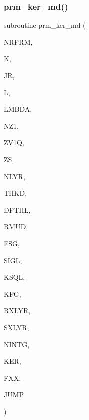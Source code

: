 \subsubsection{\texorpdfstring{prm\+\_\+ker\+\_\+md()}{prm\_ker\_md()}}
{\footnotesize\ttfamily subroutine prm\+\_\+ker\+\_\+md (\begin{DoxyParamCaption}\item[{integer}]{N\+R\+P\+RM,  }\item[{integer}]{K,  }\item[{integer}]{JR,  }\item[{integer}]{L,  }\item[{real(kind=ql)}]{L\+M\+B\+DA,  }\item[{integer}]{N\+Z1,  }\item[{real(kind=ql), dimension(nz1)}]{Z\+V1Q,  }\item[{real(kind=ql)}]{ZS,  }\item[{integer}]{N\+L\+YR,  }\item[{real(kind=ql), dimension (nlyr)}]{T\+H\+KD,  }\item[{real(kind=ql), dimension (nlyr)}]{D\+P\+T\+HL,  }\item[{real(kind=ql), dimension(0\+:nlyr)}]{R\+M\+UD,  }\item[{complex (kind=ql)}]{F\+SG,  }\item[{complex(kind=ql), dimension (nlyr)}]{S\+I\+GL,  }\item[{complex(kind=ql), dimension (nlyr)}]{K\+S\+QL,  }\item[{integer}]{K\+FG,  }\item[{integer}]{R\+X\+L\+YR,  }\item[{integer}]{S\+X\+L\+YR,  }\item[{integer}]{N\+I\+N\+TG,  }\item[{complex (kind=ql), dimension(jnlo-\/nrprm\+:jnhi,5,nz1)}]{K\+ER,  }\item[{complex (kind=ql), dimension(nrprm,5,nz1)}]{F\+XX,  }\item[{logical}]{J\+U\+MP }\end{DoxyParamCaption})}

